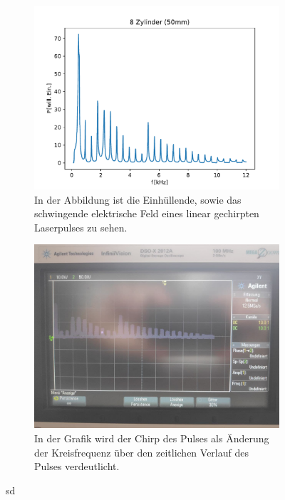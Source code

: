 \begin{figure}
            \centering
            \begin{subfigure}[b]{0.45\textwidth}
                \centering
                \includegraphics[scale=0.4]{./pictures/8_Zylinder_50mm.pdf}
                \caption{In der Abbildung ist die Einhüllende, sowie das schwingende elektrische Feld eines linear gechirpten Laserpulses zu sehen.}
            \end{subfigure}
            \hfill
            \centering
            \begin{subfigure}[b]{0.45\textwidth}
                \centering
                \includegraphics[scale=0.13]{./pictures/8_Zylinder.jpg}
                \caption{In der Grafik wird der Chirp des Pulses als Änderung der Kreisfrequenz über den zeitlichen Verlauf des Pulses verdeutlicht.}
            \end{subfigure}
            \caption{sd}
            \label{fig:pre_vgl}
        \end{figure}
    \FloatBarrier

